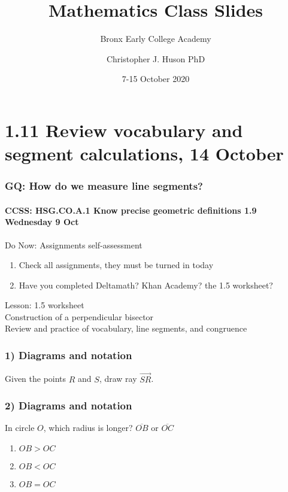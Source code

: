 \documentclass{beamer}
\title{Mathematics Class Slides}
\subtitle{Bronx Early College Academy}
\author{Christopher J. Huson PhD}
\date{7-15 October 2020}
\begin{document}
\frame{\titlepage}
\section[Outline]{}
\frame{\tableofcontents}

\section{1.11 Review vocabulary and segment calculations, 14 October}
  \frame
  {
    \frametitle{GQ: How do we measure line segments?}
    \framesubtitle{CCSS: HSG.CO.A.1 Know precise geometric definitions  \hfill \alert{1.9 Wednesday 9 Oct}}
  
    \begin{block}{Do Now: Assignments self-assessment}
    \begin{enumerate}
        \item Check all assignments, they must be turned in today
        \item Have you completed Deltamath? Khan Academy? the 1.5 worksheet?
    \end{enumerate}
    \end{block}
    Lesson: 1.5 worksheet\\
    Construction of a perpendicular bisector \\
    Review and practice of vocabulary, line segments, and congruence
  }

  \frame
  {
    \frametitle{1) Diagrams and notation}
    Given the points $R$ and $S$, draw ray $\overrightarrow{SR}$.\\
    \vspace{2cm}
    \begin{center}
    \end{center} \vspace{1cm}
  }


  \frame
  {
    \frametitle{2) Diagrams and notation}
      In circle $O$, which radius is longer? $\overline{OB}$ or $\overline{OC}$
      \begin{enumerate}
        \item $OB > OC$
        \item $OB < OC$
        \item $OB = OC$
        \end{enumerate}
  }
\end{document}
